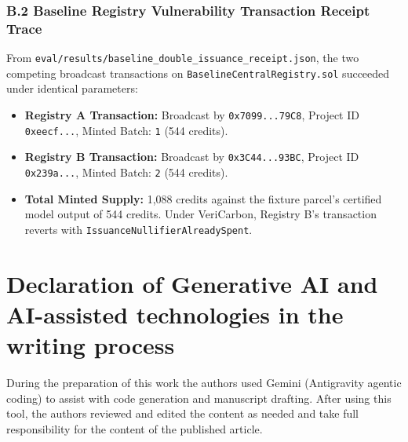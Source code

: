 \documentclass[preprint,12pt]{elsarticle}
\begin{document}
\subsubsection{B.2 Baseline Registry Vulnerability Transaction Receipt Trace}
From \texttt{eval/results/baseline\_double\_issuance\_receipt.json}, the two competing broadcast transactions on \texttt{BaselineCentralRegistry.sol} succeeded under identical parameters:
\begin{itemize}
\item \textbf{Registry A Transaction:} Broadcast by \texttt{0x7099...79C8}, Project ID \texttt{0xeecf...}, Minted Batch: \texttt{1} (544 credits).
\item \textbf{Registry B Transaction:} Broadcast by \texttt{0x3C44...93BC}, Project ID \texttt{0x239a...}, Minted Batch: \texttt{2} (544 credits).
\item \textbf{Total Minted Supply:} 1,088 credits against the fixture parcel's certified model output of 544 credits. Under VeriCarbon, Registry B's transaction reverts with \texttt{IssuanceNullifierAlreadySpent}.
\end{itemize}


\section*{Declaration of Generative AI and AI-assisted technologies in the writing process}
During the preparation of this work the authors used Gemini (Antigravity agentic coding) to assist with code generation and manuscript drafting. After using this tool, the authors reviewed and edited the content as needed and take full responsibility for the content of the published article.



\end{document}
